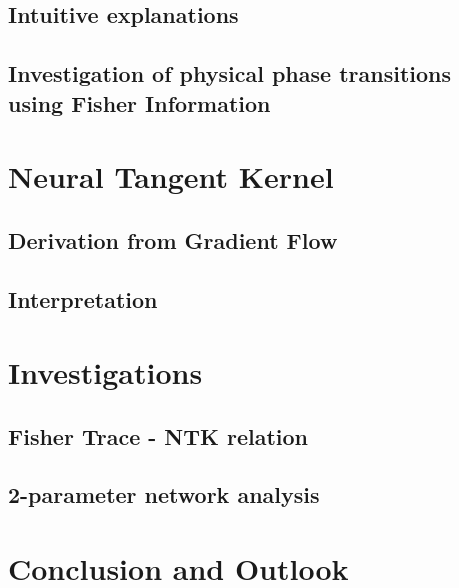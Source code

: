 \documentclass[12pt, twoside, a4paper]{report}
\begin{document}
	\section{Intuitive explanations}\label{sec:FisherInterpretation}
	
	\section{Investigation of physical phase transitions using Fisher Information}\label{sec:FIPhysics}
	
	
	
	\chapter{Neural Tangent Kernel}\label{sec:ChapterNTK}
	
	\section{Derivation from Gradient Flow}\label{sec:NTKderivation}
	
	\section{Interpretation}\label{sec:NTKInterpretation}
	
	
	\chapter{Investigations}\label{sec:ChapterResults}
	
	\section{Fisher Trace - NTK relation}\label{sec:Results1}
	
	\section{2-parameter network analysis}\label{sec:Results2}
	
	
	\chapter{Conclusion and Outlook}\label{sec:ChapterConcAndOutlook}
	
	
	
	
\end{document}
